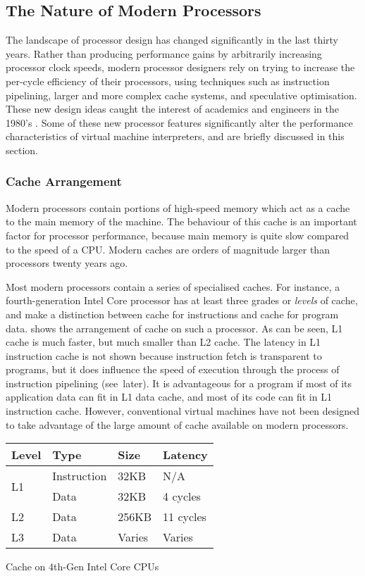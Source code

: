 		\subsection{The Nature of Modern Processors}
			The landscape of processor design has changed significantly in the last thirty years. Rather than producing performance gains by arbitrarily increasing processor clock speeds, modern processor designers rely on trying to increase the per-cycle efficiency of their processors, using techniques such as instruction pipelining, larger and more complex cache systems, and speculative optimisation. These new design ideas caught the interest of academics and engineers in the 1980's \citep{modernprocessordesign}. Some of these new processor features significantly alter the performance characteristics of virtual machine interpreters, and are briefly discussed in this section.
			
			\subsubsection{Cache Arrangement}
			Modern processors contain portions of high-speed memory which act as a cache to the main memory of the machine. The behaviour of this cache is an important factor for processor performance, because main memory is quite slow compared to the speed of a CPU. Modern caches are orders of magnitude larger than processors twenty years ago. 
			
			Most modern processors contain a series of specialised caches. For instance, a fourth-generation Intel Core processor has at least three grades or \emph{levels} of cache, and make a distinction between cache for instructions and cache for program data.  shows the arrangement of cache on such a processor. As can be seen, L1 cache is much faster, but much smaller than L2 cache. The latency in L1 instruction cache is not shown because instruction fetch is transparent to programs, but it does influence the speed of execution through the process of instruction pipelining (see~later). It is advantageous for a program if most of its application data can fit in L1 data cache, and most of its code can fit in L1 instruction cache. However, conventional virtual machines have not been designed to take advantage of the large amount of cache available on modern processors.
			
			\begin{myfigure}
				\begin{tabular}{ | l | l | l | l | }
					\hline
					Level & Type & Size & Latency \\ 
					\hline
					\multirow{2}{*}{L1} & Instruction & 32KB & N/A \\
					& Data & 32KB & 4 cycles \\
					\hline
					L2 & Data & 256KB & 11 cycles \\
					\hline
					L3 & Data & Varies & Varies \\
					\hline
				\end{tabular}
				\caption{Cache on 4th-Gen Intel Core CPUs \citep{optimisationreference}}
				\label{fig:cachenumbers}
			\end{myfigure}
			
